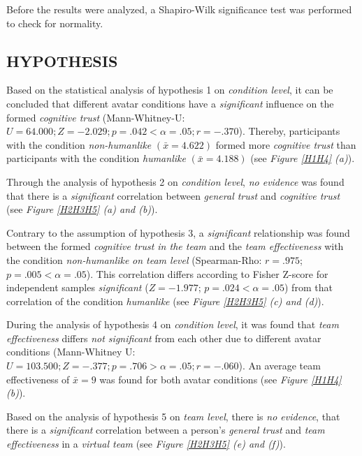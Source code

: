 \documentclass[sigchi]{acmart}
\begin{document}
Before the results were analyzed, a Shapiro-Wilk significance test was performed to check for normality.

\subsection{HYPOTHESIS}
Based on the statistical analysis of hypothesis 1 on \textit{condition level}, it can be concluded that different avatar conditions have a \textit{significant} influence on the formed \textit{cognitive trust} (Mann-Whitney-U: $U = 64.000; Z = -2.029; p =.042 < \alpha =.05; r =-.370$). Thereby, participants with the condition \textit{non-humanlike} $(\bar{x} = 4.622)$ formed more \textit{cognitive trust} than participants with the condition \textit{humanlike} $(\bar{x} = 4.188)$ (see \textit{Figure \ref{H1H4} (a)}). 

Through the analysis of hypothesis 2 on \textit{condition level}, \textit{no evidence} was found that there is a \textit{significant} correlation between \textit{general trust} and \textit{cognitive trust} (see \textit{Figure \ref{H2H3H5} (a) and (b)}). 

Contrary to the assumption of hypothesis 3, a \textit{significant} relationship was found between the formed \textit{cognitive trust in the team} and the \textit{team effectiveness} with the condition \textit{non-humanlike} \textit{on team level} (Spearman-Rho: $r =.975$; $p =.005 < \alpha = .05$). This correlation differs according to Fisher Z-score for independent samples \citep[p. 110]{cohen2013statistical} \textit{significant} ($Z=-1.977$; $p =.024 < \alpha = .05$) from that correlation of the condition \textit{humanlike} (see \textit{Figure \ref{H2H3H5} (c) and (d)}).
 
During the analysis of hypothesis 4 on \textit{condition level}, it was found that \textit{team effectiveness} differs \textit{not significant} from each other due to different avatar conditions (Mann-Whitney U: $U = 103.500; Z = -.377; p =.706 > \alpha = .05; r = -.060$). An average team effectiveness of $\bar{x} = 9$ was found for both avatar conditions (see \textit{Figure \ref{H1H4} (b)}).

Based on the analysis of hypothesis 5 on \textit{team level}, there is \textit{no evidence}, that there is a \textit{significant} correlation between a person's \textit{general trust} and \textit{team effectiveness} in a \textit{virtual team} (see \textit{Figure \ref{H2H3H5} (e) and (f)}).
\end{document}
